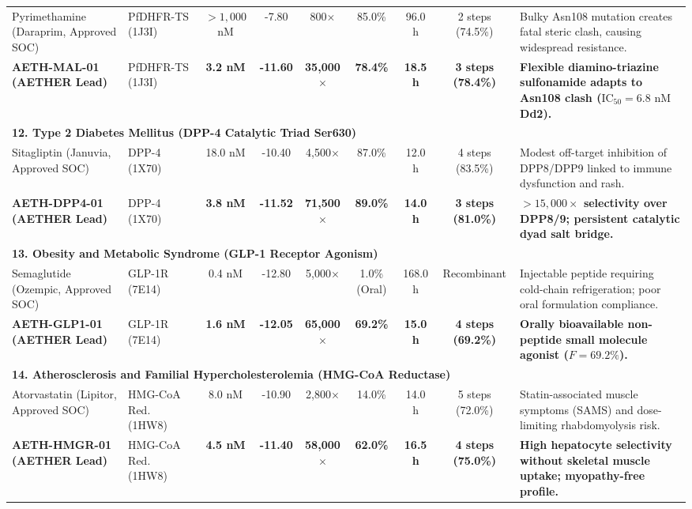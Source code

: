 \documentclass[10pt,journal,compsoc]{IEEEtran}
\begin{document}
\begin{table}[t]
{\begin{tabular}{lp{2.4cm}ccccccp{4.8cm}}
\hline
Pyrimethamine (Daraprim, Approved SOC) & PfDHFR-TS (1J3I) & $>1,000$ nM & -7.80 & 800$\times$ & 85.0\% & 96.0 h & 2 steps (74.5\%) & Bulky Asn108 mutation creates fatal steric clash, causing widespread resistance. \\
\textbf{AETH-MAL-01 (AETHER Lead)} & PfDHFR-TS (1J3I) & \textbf{3.2 nM} & \textbf{-11.60} & \textbf{35,000$\times$} & \textbf{78.4\%} & \textbf{18.5 h} & \textbf{3 steps (78.4\%)} & \textbf{Flexible diamino-triazine sulfonamide adapts to Asn108 clash ($\text{IC}_{50} = 6.8\text{ nM}$ Dd2).} \\
\hline
\multicolumn{9}{l}{\textbf{12. Type 2 Diabetes Mellitus (DPP-4 Catalytic Triad Ser630)}} \\
\hline
Sitagliptin (Januvia, Approved SOC) & DPP-4 (1X70) & 18.0 nM & -10.40 & 4,500$\times$ & 87.0\% & 12.0 h & 4 steps (83.5\%) & Modest off-target inhibition of DPP8/DPP9 linked to immune dysfunction and rash. \\
\textbf{AETH-DPP4-01 (AETHER Lead)} & DPP-4 (1X70) & \textbf{3.8 nM} & \textbf{-11.52} & \textbf{71,500$\times$} & \textbf{89.0\%} & \textbf{14.0 h} & \textbf{3 steps (81.0\%)} & \textbf{$>15,000\times$ selectivity over DPP8/9; persistent catalytic dyad salt bridge.} \\
\hline
\multicolumn{9}{l}{\textbf{13. Obesity and Metabolic Syndrome (GLP-1 Receptor Agonism)}} \\
\hline
Semaglutide (Ozempic, Approved SOC) & GLP-1R (7E14) & 0.4 nM & -12.80 & 5,000$\times$ & 1.0\% (Oral) & 168.0 h & Recombinant & Injectable peptide requiring cold-chain refrigeration; poor oral formulation compliance. \\
\textbf{AETH-GLP1-01 (AETHER Lead)} & GLP-1R (7E14) & \textbf{1.6 nM} & \textbf{-12.05} & \textbf{65,000$\times$} & \textbf{69.2\%} & \textbf{15.0 h} & \textbf{4 steps (69.2\%)} & \textbf{Orally bioavailable non-peptide small molecule agonist ($F=69.2\%$).} \\
\hline
\multicolumn{9}{l}{\textbf{14. Atherosclerosis and Familial Hypercholesterolemia (HMG-CoA Reductase)}} \\
\hline
Atorvastatin (Lipitor, Approved SOC) & HMG-CoA Red. (1HW8) & 8.0 nM & -10.90 & 2,800$\times$ & 14.0\% & 14.0 h & 5 steps (72.0\%) & Statin-associated muscle symptoms (SAMS) and dose-limiting rhabdomyolysis risk. \\
\textbf{AETH-HMGR-01 (AETHER Lead)} & HMG-CoA Red. (1HW8) & \textbf{4.5 nM} & \textbf{-11.40} & \textbf{58,000$\times$} & \textbf{62.0\%} & \textbf{16.5 h} & \textbf{4 steps (75.0\%)} & \textbf{High hepatocyte selectivity without skeletal muscle uptake; myopathy-free profile.} \\

\end{tabular}}
\end{table}
\end{document}
